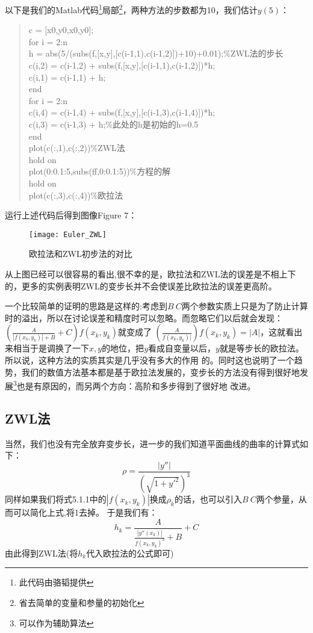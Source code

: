 \documentclass[a4paper,12pt]{article}
\begin{document}
以下是我们的Matlab代码\footnote{此代码由骆韬提供}局部\footnote{省去简单的变量和参量的初始化}，两种方法的步数都为10，我们估计$y(5)$：
\begin{quote}
\small{
c = [x0,y0,x0,y0];\\
for i = 2:n\\
    h = abs(5/(subs(f,[x,y],[c(i-1,1),c(i-1,2)])+10)+0.01);\%ZWL法的步长\\
    c(i,2) = c(i-1,2) + subs(f,[x,y],[c(i-1,1),c(i-1,2)])*h;\\
    c(i,1) = c(i-1,1) + h;\\
end\\
for i = 2:n\\
    c(i,4) = c(i-1,4) + subs(f,[x,y],[c(i-1,3),c(i-1,4)])*h;\\
    c(i,3) = c(i-1,3) + h;\%此处的h是初始的h=0.5\\
end\\
plot(c(:,1),c(:,2))\%ZWL法\\
hold on\\
plot(0:0.1:5,subs(ff,0:0.1:5))\%方程的解\\
hold on\\
plot(c(:,3),c(:,4))\%欧拉法\
}
\end{quote}

运行上述代码后得到图像Figure 7：
\begin{figure}[htpb]
\centering
\texttt{[image: Euler\_ZWL]}
\caption{欧拉法和ZWL初步法的对比}
\end{figure}
\par
从上图已经可以很容易的看出,很不幸的是，欧拉法和ZWL法的误差是不相上下的，更多的实例表明ZWL的变步长并不会使误差比欧拉法的误差更高阶。

一个比较简单的证明的思路是这样的:考虑到$B\ C$两个参数实质上只是为了防止计算时的溢出，所以在讨论误差和精度时可以忽略。而忽略它们以后就会发现：$\left(\frac{A}{\left|f(x_k,y_k)\right|+B}+C\right)f({x_k},{y_k})$就变成了
$\left(\frac{A}{f(x_k,y_k)|}\right)f({x_k},{y_k})=|A|$，这就看出来相当于是调换了一下$x,y$的地位，把$y$看成自变量以后，$y$就是等步长的欧拉法。所以说，这种方法的实质其实是几乎没有多大的作用
的。同时这也说明了一个趋势，我们的数值方法基本都是基于欧拉法发展的，变步长的方法没有得到很好地发展\footnote{可以作为辅助算法}也是有原因的，而另两个方向：高阶和多步得到了很好地
改进。

\subsection{ZWL法}
当然，我们也没有完全放弃变步长，进一步的我们知道平面曲线的曲率的计算式如下：
\[\rho=\frac{|y''|}{\left(\sqrt{1+y'^2}\right)^3}\]
同样如果我们将式5.1.1中的$|f(x_k,y_k)|$换成$\rho_k$的话，也可以引入$B\ C$两个参量，从而可以简化上式,将1去掉。
于是我们有：
\begin{equation}
h_k=\frac{A}{\frac{|y''(x_k)|}{f(x_k,y_k)^3}+B}+C
\end{equation}
由此得到ZWL法(将$h_k$代入欧拉法的公式即可)
\end{document}
